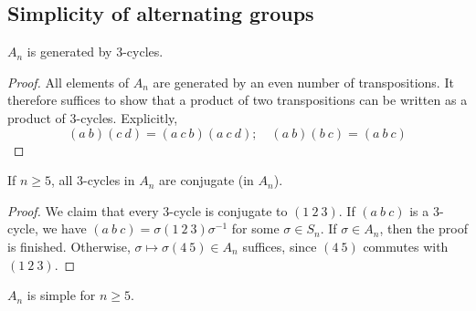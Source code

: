 \subsection{Simplicity of alternating groups}
\begin{lemma}
	\( A_n \) is generated by 3-cycles.
\end{lemma}
\begin{proof}
	All elements of \( A_n \) are generated by an even number of transpositions.
	It therefore suffices to show that a product of two transpositions can be written as a product of 3-cycles.
	Explicitly,
	\[ (a\ b)(c\ d) = (a\ c\ b)(a\ c\ d);\quad (a\ b)(b\ c) = (a\ b\ c) \]
\end{proof}
\begin{lemma}
	If \( n \geq 5 \), all 3-cycles in \( A_n \) are conjugate (in \( A_n \)).
\end{lemma}
\begin{proof}
	We claim that every 3-cycle is conjugate to \( (1\ 2\ 3) \).
	If \( (a\ b\ c) \) is a 3-cycle, we have \( (a\ b\ c) = \sigma(1\ 2\ 3)\sigma^{-1} \) for some \( \sigma \in S_n \).
	If \( \sigma \in A_n \), then the proof is finished.
	Otherwise, \( \sigma \mapsto \sigma(4\ 5) \in A_n \) suffices, since \( (4\ 5) \) commutes with \( (1\ 2\ 3) \).
\end{proof}
\begin{theorem}
	\( A_n \) is simple for \( n \geq 5 \).
\end{theorem}
